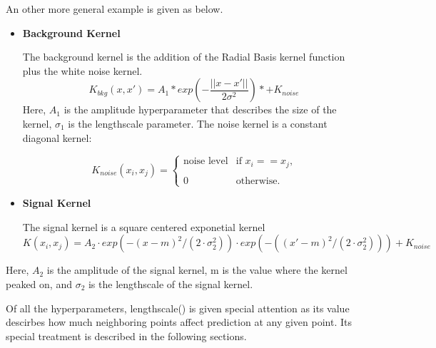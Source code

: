 An other more general example is given as below.
%
    \begin{itemize}
        \item \textbf{Background Kernel}

            The background kernel is the addition of the Radial Basis kernel function plus the white noise kernel.
            \begin{equation}
                K_{bkg}(x, x') = A_{1} * exp(-\frac{||x-x'||}{2\sigma^{2}}) *+ K_{noise}
                \label{eq:backgroundkernel}
            \end{equation}
            Here, $A_{1}$ is the amplitude hyperparameter that describes the size of the kernel, $\sigma_{1}$ is the lengthscale parameter.
            The noise kernel is a constant diagonal kernel:
            

			\begin{equation}
            K_{noise}(x_{i}, x_{j}) =
			\begin{cases} \text{noise level} & \text{if $x_{i}==x_{j}$,} \\
			\\
            0 & \text{otherwise.}
			\end{cases}
			\end{equation}

        \item \textbf{Signal Kernel}

            The signal kernel is a square centered exponetial kernel
            \begin{equation}
            K(x_{i}, x_{j})=A_{2}\cdot exp(-(x-m)^{2}/(2\cdot\sigma_{2}^{2}))\cdot exp(-((x'-m)^{2}/(2\cdot\sigma_{2}^{2}))) + K_{noise}
            \label{eq:signalkernel}
            \end{equation}

    \end{itemize}
            Here, $A_{2}$ is the amplitude of the signal kernel, m is the value where the kernel peaked on, and $\sigma_{2}$ is the lengthscale of the signal kernel. 

	Of all the hyperparameters, lengthscale(\sigma) is given special attention as its value descirbes how much neighboring points affect prediction at any given point. Its special treatment is described in the following sections.

